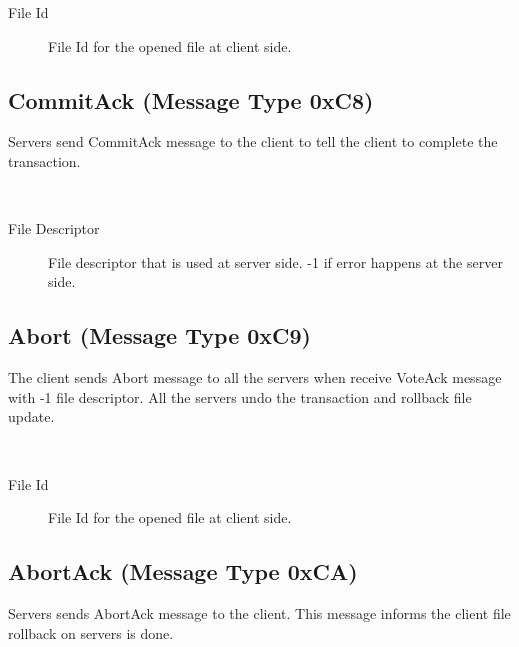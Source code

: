 \documentclass[12pt,fleqn]{article}
\begin{document}
\begin{description}
	\item[File Id] File Id for the opened file at client side.
\end{description}

\subsection{CommitAck (Message Type 0xC8)}
Servers send CommitAck message to the client to tell the client to complete the transaction.

\begin{center}
	\begin{bytefield}[bitwidth=1.1em]{16}
		 \\
	\end{bytefield}
\end{center}

\begin{description}
	\item[File Descriptor] File descriptor that is used at server side. -1 if error happens at the server side.
\end{description}

\subsection{Abort (Message Type 0xC9)}
The client sends Abort message to all the servers when receive VoteAck message with -1 file descriptor. All the servers undo the transaction and rollback file update.

\begin{center}
	\begin{bytefield}[bitwidth=1.1em]{16}
		 \\
	\end{bytefield}
\end{center}

\begin{description}
	\item[File Id] File Id for the opened file at client side.
\end{description}

\subsection{AbortAck (Message Type 0xCA)}
Servers sends AbortAck message to the client. This message informs the client file rollback on servers is done.
\end{document}
